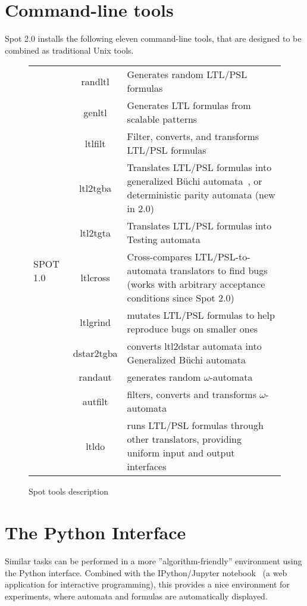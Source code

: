 \section{Command-line tools}
Spot 2.0 installs the following eleven command-line tools, that are designed to be combined as traditional
Unix tools.\\
\begin{figure}[H]
 \begin{tabular}{l c | m{8cm}}
  \multirow{13}{*}{SPOT 1.0~\cite{1}}&randltl&Generates random LTL/PSL formulas\\
   &genltl&Generates LTL formulas from scalable patterns\\
   &ltlfilt&Filter, converts, and transforms LTL/PSL formulas\\
   &ltl2tgba&Translates LTL/PSL formulas into generalized Büchi automata~\cite{7}, or deterministic parity
	     automata (new in 2.0)\\
   &ltl2tgta&Translates LTL/PSL formulas into Testing automata~\cite{6}\\
   &ltlcross&Cross-compares LTL/PSL-to-automata translators to find bugs (works with arbitrary acceptance
	     conditions since Spot 2.0)\\
   \hline
   &ltlgrind&mutates LTL/PSL formulas to help reproduce bugs on smaller ones\\
   &dstar2tgba&converts ltl2dstar automata into Generalized Büchi automata~\cite{14}\\
   &randaut&generates random $\omega$-automata\\
   &autfilt&filters, converts and transforms $\omega$-automata\\
   &ltldo&runs LTL/PSL formulas through other translators, providing uniform input and output interfaces\\
 \end{tabular}
 \caption{Spot tools description}
\end{figure}

\section{The Python Interface}
Similar tasks can be performed in a more ''algorithm-friendly'' environment using the Python interface.
Combined with the IPython/Jupyter notebook~\cite{4} (a web application for interactive programming), this
provides a nice environment for experiments, where automata and formulas are automatically displayed.

